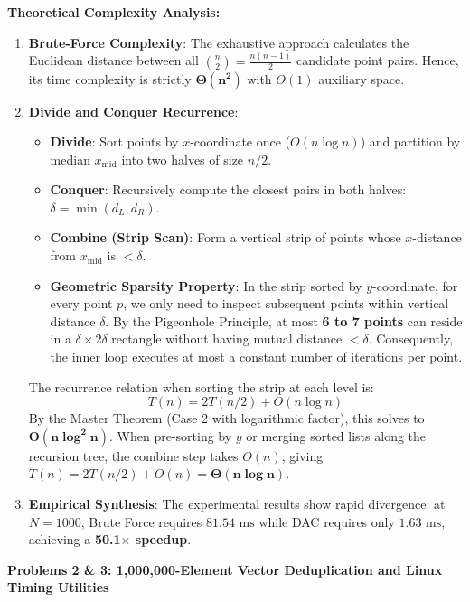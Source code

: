 \documentclass[12pt]{article}
\begin{document}
\vspace{0.3cm}
\textbf{Theoretical Complexity Analysis:}
\begin{enumerate}
    \item \textbf{Brute-Force Complexity}: The exhaustive approach calculates the Euclidean distance between all $\binom{n}{2} = \frac{n(n-1)}{2}$ candidate point pairs. Hence, its time complexity is strictly $\mathbf{\Theta(n^2)}$ with $O(1)$ auxiliary space.
    \item \textbf{Divide and Conquer Recurrence}:
    \begin{itemize}
        \item \textbf{Divide}: Sort points by $x$-coordinate once ($O(n \log n)$) and partition by median $x_{\text{mid}}$ into two halves of size $n/2$.
        \item \textbf{Conquer}: Recursively compute the closest pairs in both halves: $\delta = \min(d_L, d_R)$.
        \item \textbf{Combine (Strip Scan)}: Form a vertical strip of points whose $x$-distance from $x_{\text{mid}}$ is $< \delta$.
        \item \textbf{Geometric Sparsity Property}: In the strip sorted by $y$-coordinate, for every point $p$, we only need to inspect subsequent points within vertical distance $\delta$. By the Pigeonhole Principle, at most \textbf{6 to 7 points} can reside in a $\delta \times 2\delta$ rectangle without having mutual distance $< \delta$. Consequently, the inner loop executes at most a constant number of iterations per point.
    \end{itemize}
    The recurrence relation when sorting the strip at each level is:
    \[
    T(n) = 2T(n/2) + O(n \log n)
    \]
    By the Master Theorem (Case 2 with logarithmic factor), this solves to $\mathbf{O(n \log^2 n)}$. When pre-sorting by $y$ or merging sorted lists along the recursion tree, the combine step takes $O(n)$, giving $T(n) = 2T(n/2) + O(n) = \mathbf{\Theta(n \log n)}$.
    \item \textbf{Empirical Synthesis}: The experimental results show rapid divergence: at $N = 1000$, Brute Force requires $81.54\text{ ms}$ while DAC requires only $1.63\text{ ms}$, achieving a \textbf{50.1$\times$ speedup}.
\end{enumerate}

\newpage

\begin{center}
\textbf{Problems 2 \& 3: 1,000,000-Element Vector Deduplication and Linux Timing Utilities}
\end{center}
\end{document}
